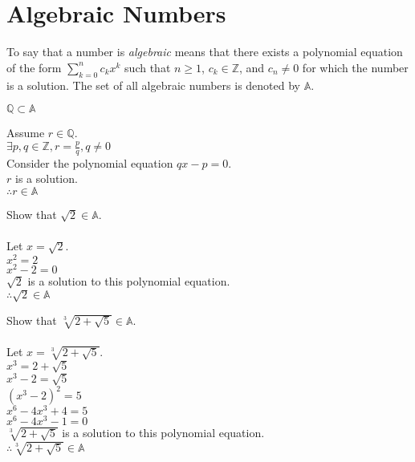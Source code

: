 \documentclass[letterpaper,12pt,fleqn]{article}
\begin{document}
\section*{Algebraic Numbers}

\begin{definition}
To say that a number is \emph{algebraic} means that there exists a polynomial
equation of the form $\sum_{k=0}^nc_kx^k$ such that $n\ge1$, $c_k\in\mathbb{Z}$,
and $c_n\ne0$ for which the number is a solution. The set of all algebraic
numbers is denoted by $\mathbb{A}$.
\end{definition}

\begin{theorem}
$\mathbb{Q}\subset\mathbb{A}$
\end{theorem}

\begin{theproof}
Assume $r\in\mathbb{Q}$. \\
$\exists p,q\in\mathbb{Z},r=\frac{p}{q}, q\ne0$ \\
Consider the polynomial equation $qx-p=0$. \\
$r$ is a solution. \\
$\therefore r\in\mathbb{A}$
\end{theproof}

\begin{example}
Show that $\sqrt{2}\in\mathbb{A}$. \\
\\
Let $x=\sqrt{2}$. \\
$x^2=2$ \\
$x^2-2=0$ \\
$\sqrt{2}$ is a solution to this polynomial equation. \\
$\therefore\sqrt{2}\in\mathbb{A}$
\end{example}

\begin{example}
Show that $\sqrt[3]{2+\sqrt{5}}\in\mathbb{A}$. \\
\\
Let $x=\sqrt[3]{2+\sqrt{5}}$. \\
$x^3=2+\sqrt{5}$ \\
$x^3-2=\sqrt{5}$ \\
$(x^3-2)^2=5$ \\
$x^6-4x^3+4=5$ \\
$x^6-4x^3-1=0$ \\
$\sqrt[3]{2+\sqrt{5}}$ is a solution to this polynomial equation. \\
$\therefore\sqrt[3]{2+\sqrt{5}}\in\mathbb{A}$
\end{example}
\end{document}
